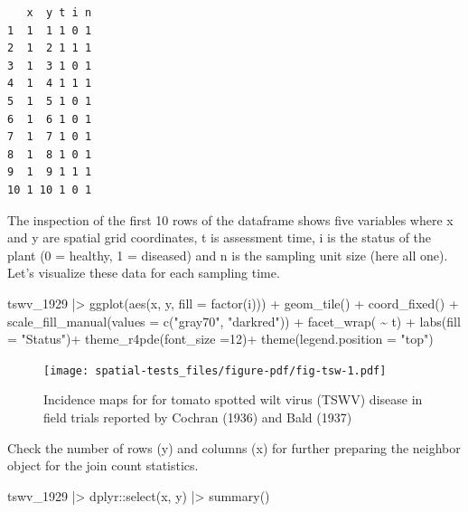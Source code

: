 \documentclass[
  letterpaper,
]{book}
\newenvironment{Shaded}{\begin{snugshade}}{\end{snugshade}}
\newcommand{\AttributeTok}[1]{\textcolor[rgb]{0.40,0.45,0.13}{#1}}
\newcommand{\DecValTok}[1]{\textcolor[rgb]{0.68,0.00,0.00}{#1}}
\newcommand{\FunctionTok}[1]{\textcolor[rgb]{0.28,0.35,0.67}{#1}}
\newcommand{\NormalTok}[1]{\textcolor[rgb]{0.00,0.23,0.31}{#1}}
\newcommand{\SpecialCharTok}[1]{\textcolor[rgb]{0.37,0.37,0.37}{#1}}
\newcommand{\StringTok}[1]{\textcolor[rgb]{0.13,0.47,0.30}{#1}}
\begin{document}
\begin{verbatim}
   x  y t i n
1  1  1 1 0 1
2  1  2 1 1 1
3  1  3 1 0 1
4  1  4 1 1 1
5  1  5 1 0 1
6  1  6 1 0 1
7  1  7 1 0 1
8  1  8 1 0 1
9  1  9 1 1 1
10 1 10 1 0 1
\end{verbatim}

The inspection of the first 10 rows of the dataframe shows five
variables where x and y are spatial grid coordinates, t is assessment
time, i is the status of the plant (0 = healthy, 1 = diseased) and n is
the sampling unit size (here all one). Let's visualize these data for
each sampling time.

\begin{Shaded}
\begin{Highlighting}[]
\NormalTok{tswv\_1929 }\SpecialCharTok{|\textgreater{}}
  \FunctionTok{ggplot}\NormalTok{(}\FunctionTok{aes}\NormalTok{(x, y, }\AttributeTok{fill =} \FunctionTok{factor}\NormalTok{(i))) }\SpecialCharTok{+}
  \FunctionTok{geom\_tile}\NormalTok{() }\SpecialCharTok{+}
  \FunctionTok{coord\_fixed}\NormalTok{() }\SpecialCharTok{+}
  \FunctionTok{scale\_fill\_manual}\NormalTok{(}\AttributeTok{values =} \FunctionTok{c}\NormalTok{(}\StringTok{"gray70"}\NormalTok{, }\StringTok{"darkred"}\NormalTok{)) }\SpecialCharTok{+}
  \FunctionTok{facet\_wrap}\NormalTok{( }\SpecialCharTok{\textasciitilde{}}\NormalTok{ t) }\SpecialCharTok{+}
  \FunctionTok{labs}\NormalTok{(}\AttributeTok{fill =} \StringTok{"Status"}\NormalTok{)}\SpecialCharTok{+}
  \FunctionTok{theme\_r4pde}\NormalTok{(}\AttributeTok{font\_size =}\DecValTok{12}\NormalTok{)}\SpecialCharTok{+}
  \FunctionTok{theme}\NormalTok{(}\AttributeTok{legend.position =} \StringTok{"top"}\NormalTok{)}
\end{Highlighting}
\end{Shaded}

\begin{figure}[H]

\texttt{[image: spatial-tests\_files/figure-pdf/fig-tsw-1.pdf]} \hfill{}

\caption{\label{fig-tsw}Incidence maps for for tomato spotted wilt virus
(TSWV) disease in field trials reported by Cochran (1936) and Bald
(1937)}

\end{figure}

Check the number of rows (y) and columns (x) for further preparing the
neighbor object for the join count statistics.

\begin{Shaded}
\begin{Highlighting}[]
\NormalTok{tswv\_1929 }\SpecialCharTok{|\textgreater{}} 
\NormalTok{  dplyr}\SpecialCharTok{::}\FunctionTok{select}\NormalTok{(x, y) }\SpecialCharTok{|\textgreater{}} 
  \FunctionTok{summary}\NormalTok{()}
\end{Highlighting}
\end{Shaded}
\end{document}
